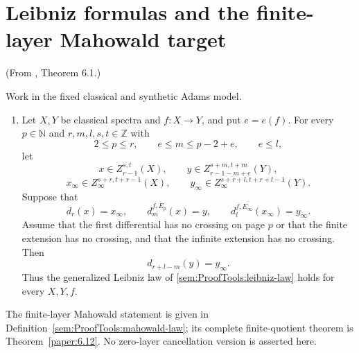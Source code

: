 \section{Leibniz formulas and the finite-layer Mahowald target}
\begin{theorem}
\label{frontier:ProofTools:003e9deb7ec5}
(From \cite{LWX126}, Theorem 6.1.)\par
Work in the fixed classical and synthetic Adams model.
\begin{enumerate}
\item Let $X,Y$ be classical spectra and $f:X\to Y$, and put $e=e(f)$. For every $p\in\mathbb N$ and $r,m,l,s,t\in\mathbb Z$ with
\[2\leq p\leq r,\qquad e\leq m\leq p-2+e,\qquad e\leq l,\]
let
\[x\in Z_{r-1}^{s,t}(X),\qquad y\in Z_{r-1-m+e}^{s+m,t+m}(Y),\]
\[x_\infty\in Z_\infty^{s+r,t+r-1}(X),\qquad y_\infty\in Z_\infty^{s+r+l,t+r+l-1}(Y).
\]
Suppose that
\[d_r(x)=x_\infty,\qquad d_m^{f,E_p}(x)=y,\qquad d_l^{f,E_\infty}(x_\infty)=y_\infty.
\]
Assume that the first differential has no crossing on page $p$ or that the finite extension has no crossing, and that the infinite extension has no crossing. Then
\[d_{r+l-m}(y)=y_\infty.
\]
Thus the generalized Leibniz law of \ref{sem:ProofTools:leibniz-law} holds for every $X,Y,f$.

\end{enumerate}
\end{theorem}

The finite-layer Mahowald statement is given in Definition~\ref{sem:ProofTools:mahowald-law}; its complete finite-quotient theorem is Theorem~\ref{paper:6.12}. No zero-layer cancellation version is asserted here.
